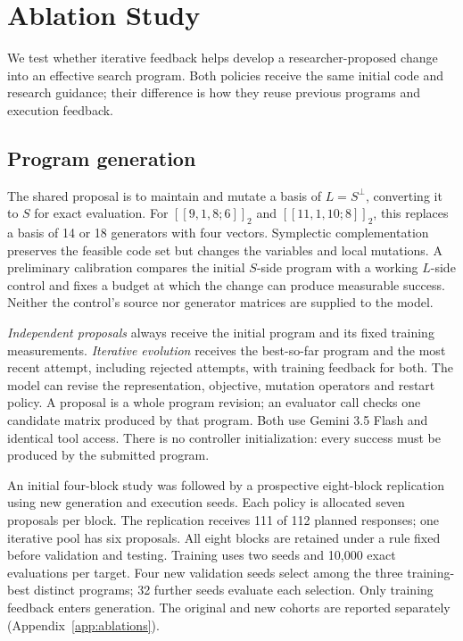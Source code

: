 \documentclass{article}
\begin{document}
\FloatBarrier
\section{Ablation Study}\label{sec:ablation}

We test whether iterative feedback helps develop a researcher-proposed
change into an effective search program. Both policies receive the same
initial code and research guidance; their difference is how they reuse
previous programs and execution feedback.

\subsection{Program generation}
The shared proposal is to maintain and mutate a basis of
$L=S^\perp$, converting it to $S$ for exact evaluation. For
$[[9,1,8;6]]_2$ and $[[11,1,10;8]]_2$, this replaces a basis of 14 or
18 generators with four vectors. Symplectic complementation preserves
the feasible code set but changes the variables and local mutations.
A preliminary calibration compares the initial $S$-side program with
a working $L$-side control and fixes a budget at which the change can
produce measurable success. Neither the control's source nor generator
matrices are supplied to the model.

\emph{Independent proposals} always receive the initial program and its
fixed training measurements. \emph{Iterative evolution} receives the
best-so-far program and the most recent attempt, including rejected
attempts, with training feedback for both. The model can revise the
representation, objective, mutation operators and restart policy.
A proposal is a whole program revision; an evaluator call checks one
candidate matrix produced by that program. Both use Gemini 3.5 Flash
and identical tool access. There is no
controller initialization: every success must be produced by the
submitted program.

An initial four-block study was followed by a prospective eight-block
replication using new generation and execution seeds. Each policy is
allocated seven proposals per block. The replication receives 111 of
112 planned responses; one iterative pool has six proposals. All eight
blocks are retained under a rule fixed before validation and testing.
Training uses two seeds and 10,000 exact evaluations per target. Four
new validation seeds select among the three training-best distinct
programs; 32 further seeds evaluate each selection. Only training
feedback enters generation. The original and new cohorts are reported
separately (Appendix~\ref{app:ablations}).
\end{document}
